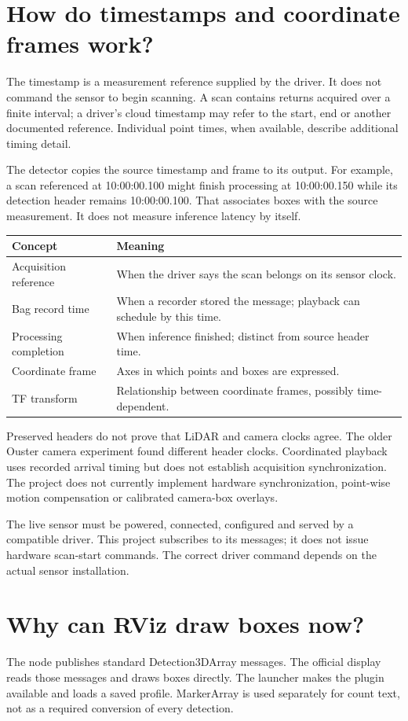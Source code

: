 \documentclass[11pt,a4paper]{article}
\newcommand{\code}[1]{\texttt{\detokenize{#1}}}
\begin{document}
\section{How do timestamps and coordinate frames work?}
The timestamp is a measurement reference supplied by the driver. It does not
command the sensor to begin scanning. A scan contains returns acquired over a
finite interval; a driver's cloud timestamp may refer to the start, end or
another documented reference. Individual point times, when available, describe
additional timing detail.

The detector copies the source timestamp and frame to its output. For example,
a scan referenced at 10:00:00.100 might finish processing at 10:00:00.150 while
its detection header remains 10:00:00.100. That associates boxes with the source
measurement. It does not measure inference latency by itself.

\begin{tabularx}{\linewidth}{@{}lY@{}}
\toprule Concept & Meaning \\ \midrule
Acquisition reference & When the driver says the scan belongs on its sensor clock. \\
Bag record time & When a recorder stored the message; playback can schedule by this time. \\
Processing completion & When inference finished; distinct from source header time. \\
Coordinate frame & Axes in which points and boxes are expressed. \\
TF transform & Relationship between coordinate frames, possibly time-dependent. \\
\bottomrule
\end{tabularx}
Preserved headers do not prove that LiDAR and camera clocks agree. The older
Ouster camera experiment found different header clocks. Coordinated playback
uses recorded arrival timing but does not establish acquisition synchronization.
The project does not currently implement hardware synchronization, point-wise
motion compensation or calibrated camera-box overlays.

The live sensor must be powered, connected, configured and served by a compatible
driver. This project subscribes to its messages; it does not issue hardware
scan-start commands. The correct driver command depends on the actual sensor
installation.

\section{Why can RViz draw boxes now?}
The node publishes standard Detection3DArray messages. The official
\code{vision_msgs_rviz_plugins/Detection3DArray} display reads those messages
and draws boxes directly. The launcher makes the plugin available and loads a
saved profile. MarkerArray is used separately for count text, not as a required
conversion of every detection.
\end{document}
